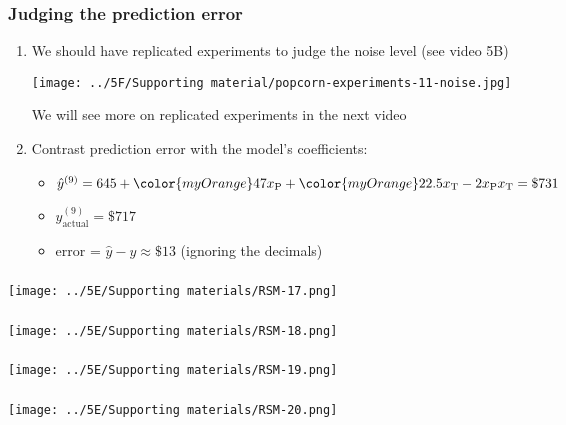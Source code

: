 \begin{frame}\frametitle{Judging the prediction error}
	\begin{enumerate}
		\item	We should have replicated experiments to judge the noise level (see video 5B)
		
		\centerline{
			\texttt{[image: ../5F/Supporting material/popcorn-experiments-11-noise.jpg]}}
		{\small We will see more on replicated experiments in the next video}
		
		\vspace{1cm}
		\pause
		
		\item	Contrast prediction error with the model's coefficients:
		\begin{itemize}
			\item	$\hat{y}^{(9)}  = 645 + {\color{myOrange}47} x_\text{P}+ {\color{myOrange}22.5} x_\text{T} - 2x_\text{P}x_\text{T} = \$731$
			\item	$y_\text{actual}^{(9)} = \$717$ 
			\item	error = $\hat{y} - y \approx \$ 13 $ (ignoring the decimals)
		\end{itemize}
		
	\end{enumerate}
\end{frame}

\begin{frame}\frametitle{}
	\centerline{\texttt{[image: ../5E/Supporting materials/RSM-17.png]}}
\end{frame}
\begin{frame}\frametitle{}
	\centerline{\texttt{[image: ../5E/Supporting materials/RSM-18.png]}}
\end{frame}
\begin{frame}\frametitle{}
	\centerline{\texttt{[image: ../5E/Supporting materials/RSM-19.png]}}
\end{frame}
\begin{frame}\frametitle{}
	\centerline{\texttt{[image: ../5E/Supporting materials/RSM-20.png]}}
\end{frame}

